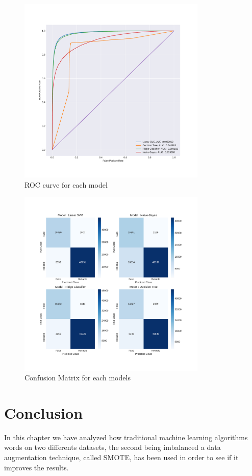 \begin{figure}
	\centering
	\includegraphics[width=0.8\textwidth]{images/chapitre3/roc3}
	\caption{ROC curve for each model}
	\label{fig:chap3:roc3}
\end{figure}

\begin{figure}
	\centering
	\includegraphics[width=0.8\textwidth]{images/chapitre3/test_SMOTE_fake_confMat}
	\caption{Confusion Matrix for each models}
	\label{fig:chap3:confMat3}
\end{figure}

\section{Conclusion}
In this chapter we have analyzed how traditional machine learning algorithms words on two differents datasets, the second being imbalanced a data augmentation technique, called SMOTE, has been used in order to see if it improves the results. \\

